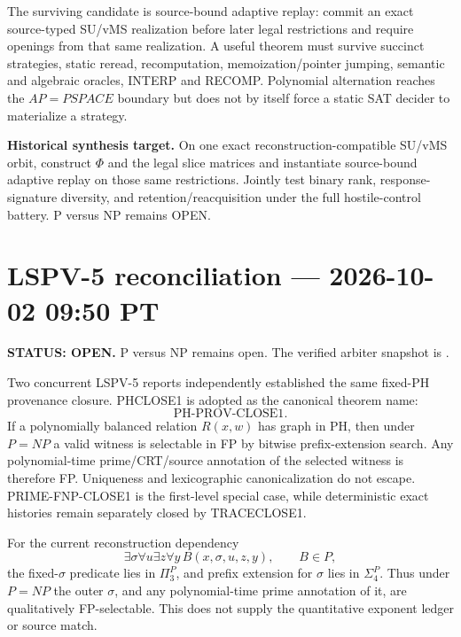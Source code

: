 \documentclass[11pt]{article}
\begin{document}
The surviving candidate is source-bound adaptive replay: commit an exact source-typed SU/vMS
realization before later legal restrictions and require openings from that same realization.
A useful theorem must survive succinct strategies, static reread, recomputation, memoization/pointer
jumping, semantic and algebraic oracles, INTERP and RECOMP. Polynomial alternation reaches the
\(AP=PSPACE\) boundary but does not by itself force a static SAT decider to materialize a strategy.

\begin{candidatebox}
\textbf{Historical synthesis target.}
On one exact reconstruction-compatible SU/vMS orbit, construct \(\Phi\) and the legal slice matrices
and instantiate source-bound adaptive replay on those same restrictions. Jointly test binary rank,
response-signature diversity, and retention/reacquisition under the full hostile-control battery.
P versus NP remains OPEN.
\end{candidatebox}



\section{LSPV-5 reconciliation --- 2026-10-02 09:50 PT}
\textbf{STATUS: OPEN.} P versus NP remains open. The verified arbiter snapshot is
.

Two concurrent LSPV-5 reports independently established the same fixed-PH provenance closure.
PHCLOSE1 is adopted as the canonical theorem name:
\[
\boxed{\text{PH-PROV-CLOSE1}.}
\]
If a polynomially balanced relation \(R(x,w)\) has graph in PH, then under \(P=NP\) a valid
witness is selectable in FP by bitwise prefix-extension search. Any polynomial-time prime/CRT/source
annotation of the selected witness is therefore FP. Uniqueness and lexicographic canonicalization do
not escape. PRIME-FNP-CLOSE1 is the first-level special case, while deterministic exact histories
remain separately closed by TRACECLOSE1.

For the current reconstruction dependency
\[
\exists\sigma\forall u\exists z\forall y\,B(x,\sigma,u,z,y),\qquad B\in P,
\]
the fixed-\(\sigma\) predicate lies in \(\Pi_3^P\), and prefix extension for \(\sigma\) lies
in \(\Sigma_4^P\). Thus under \(P=NP\) the outer \(\sigma\), and any polynomial-time prime
annotation of it, are qualitatively FP-selectable. This does not supply the quantitative exponent
ledger or source match.
\end{document}
